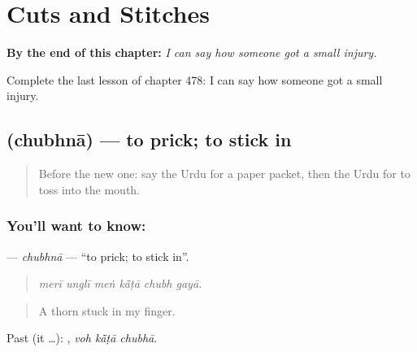 
\chapter{Cuts and Stitches}
\label{ch:ur-cuts-and-stitches}

\begin{chapteropening}
\textbf{By the end of this chapter:} \emph{I can say how someone got a small injury.}

Complete the last lesson of chapter 478: I can say how someone got a small injury.
\end{chapteropening}

\section[\texorpdfstring{\ur{چبھنا} (chubhnā)}{چبھنا (chubhnā)}]{ (chubhnā) — to prick; to stick in}

\label{lesson:UR-C478-chubhna}



\begin{quote}
Before the new one: say the Urdu for a paper packet, then the Urdu for to toss into the mouth.
\end{quote}

\subsection*{You'll want to know: }
\textbf{} — \emph{chubhnā} — \textquotedblleft{}to prick; to stick in\textquotedblright{}.

\begin{quote}
     
\end{quote}

\begin{quote}
\emph{merī unglī meṅ kā̃ṭā chubh gayā.}
\end{quote}

\begin{quote}
A thorn stuck in my finger.
\end{quote}

Past (it …):   , \emph{voh kā̃ṭā chubhā}.

